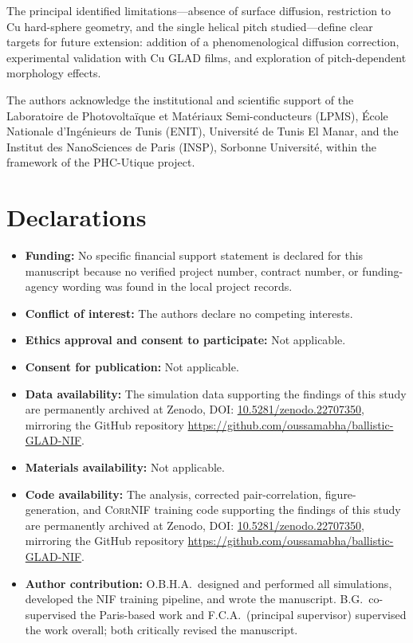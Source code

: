 \documentclass[aip,amsmath,amssymb,reprint]{revtex4-1}
\begin{document}
The principal identified limitations---absence of surface diffusion, restriction
to Cu hard-sphere geometry, and the single helical pitch studied---define
clear targets for future extension: addition of a phenomenological diffusion
correction, experimental validation with Cu GLAD films, and exploration of
pitch-dependent morphology effects.

\begin{acknowledgments}
The authors acknowledge the institutional and scientific support of the
Laboratoire de Photovolta\"ique et Mat\'eriaux Semi-conducteurs (LPMS),
\'Ecole Nationale d'Ing\'enieurs de Tunis (ENIT), Universit\'e de Tunis El
Manar, and the Institut des NanoSciences de Paris (INSP), Sorbonne
Universit\'e, within the framework of the PHC-Utique project.
\end{acknowledgments}

\section*{Declarations}

\begin{itemize}
\item \textbf{Funding:} No specific financial support statement is declared
  for this manuscript because no verified project number, contract number, or
  funding-agency wording was found in the local project records.
\item \textbf{Conflict of interest:} The authors declare no competing interests.
\item \textbf{Ethics approval and consent to participate:} Not applicable.
\item \textbf{Consent for publication:} Not applicable.
\item \textbf{Data availability:} The simulation data supporting the
  findings of this study are permanently archived at Zenodo,
  DOI: \href{https://doi.org/10.5281/zenodo.22707350}{10.5281/zenodo.22707350}, mirroring the GitHub repository
  \url{https://github.com/oussamabha/ballistic-GLAD-NIF}.
\item \textbf{Materials availability:} Not applicable.
\item \textbf{Code availability:} The analysis, corrected pair-correlation,
  figure-generation, and \textsc{CorrNIF} training code supporting the
  findings of this study are permanently archived at Zenodo,
  DOI: \href{https://doi.org/10.5281/zenodo.22707350}{10.5281/zenodo.22707350}, mirroring the GitHub repository
  \url{https://github.com/oussamabha/ballistic-GLAD-NIF}.
\item \textbf{Author contribution:} O.B.H.A.\ designed and performed all
  simulations, developed the NIF training pipeline, and wrote the manuscript.
  B.G.\ co-supervised the Paris-based work and F.C.A.\ (principal supervisor)
  supervised the work overall; both critically revised
  the manuscript.
\end{itemize}
\end{document}
